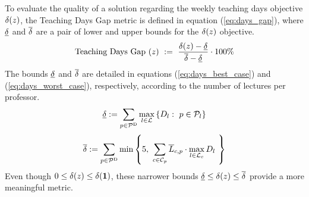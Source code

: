         To evaluate the quality of a solution regarding the weekly teaching days objective $\delta(z)$, the Teaching Days Gap metric is defined in equation (\ref{eq:days_gap}), where $\underline{\delta}$ and $\overline{\delta}$ are a pair of lower and upper bounds for the $\delta(z)$ objective.
        \begin{equation}
            \begin{split}
                \text{Teaching Days Gap }(z) \ := \ \frac{\delta(z)-\underline{\delta}}{\overline{\delta}-\underline{\delta}} \cdot 100\%
            \end{split}
            \label{eq:days_gap}
        \end{equation}
        The bounds $\underline{\delta}$ and $\overline{\delta}$ are detailed in equations (\ref{eq:days_best_case}) and (\ref{eq:days_worst_case}), respectively, according to the number of lectures per professor.
        \begin{equation}
            \underline{\delta} :=\sum_{p\in\mathcal{P}^\text{D}} \max_{l\in\mathcal{L}} \left\{ D_l:\ p \in \mathcal{P}_l\right\}
            \label{eq:days_best_case}
        \end{equation}
        \begin{equation}
            \overline{\delta} :=\sum_{p\in\mathcal{P}^\text{D}} \min \left\{5, \ \sum_{c\in\mathcal{C}_p} \overline{L}_{c,p} \cdot \max_{l\in\mathcal{L}_c} {D_l} \ \right\}
            \label{eq:days_worst_case}
        \end{equation}
        Even though $0\leq \delta(z)\leq \delta(\mathbf{1})$, these narrower bounds $\underline{\delta} \leq \delta(z) \leq \overline{\delta}$ provide a more meaningful metric.



        


